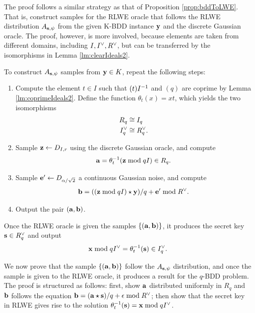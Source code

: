 \documentclass[../main.tex]{subfiles}
\begin{document}
The proof follows a similar strategy as that of Proposition \ref{prop:bddToLWE}. That is, construct samples for the RLWE oracle that follows the RLWE distribution $A_{\mathbf{s},\psi}$ from the given K-BDD instance $\mathbf{y}$ and the discrete Gaussian oracle. The proof, however, is more involved, because elements are taken from different domains, including $I, I^{\vee}, R^{\vee}$, but can be transferred by the isomorphisms in Lemma \ref{lm:clearIdeals2}. 

To construct $A_{\mathbf{s},\psi}$ samples from $\mathbf{y} \in K$, repeat the following steps: 
\begin{enumerate}
    \item Compute the element $t \in I$ such that $(t)I^{-1}$ and $(q)$ are coprime by Lemma \ref{lm:coprimeIdeals2}. Define the function $\theta_t(x) = xt$, which yields the two isomorphisms 
    \begin{align*}
        R_q & \cong I_q \\ 
        I^{\vee}_q &\cong R^{\vee}_q.
    \end{align*}
    
    \item Sample $\mathbf{z} \leftarrow D_{I, r}$ using the discrete Gaussian oracle, and compute 
    \begin{align*}
        \mathbf{a} =\theta^{-1}_t(\mathbf{z} \bmod qI) \in R_q.
    \end{align*}
    
    \item Sample $\mathbf{e}' \leftarrow D_{\alpha/\sqrt{2}}$ a continuous Gaussian noise, and compute 
    \begin{align*}
        \mathbf{b} = ((\mathbf{z} \bmod qI) \star \mathbf{y})/q + \mathbf{e}' \bmod R^{\vee}.
    \end{align*}
    
    \item Output the pair $(\mathbf{a},\mathbf{b})$.
    
\end{enumerate}
Once the RLWE oracle is given the samples $\{(\mathbf{a},\mathbf{b})\}$, it produces the secret key $\mathbf{s} \in R^{\vee}_q$ and output 
\begin{align*}
    \mathbf{x} \bmod qI^{\vee} = \theta^{-1}_t(\mathbf{s}) \in I^{\vee}_q.
\end{align*}

We now prove that the sample $\{(\mathbf{a},\mathbf{b})\}$ follow the $A_{\mathbf{s},\psi}$ distribution,
and once the sample is given to the RLWE oracle, it produces a result for the $q$-BDD problem. The proof is structured as follows: first, show $\mathbf{a}$ distributed uniformly in $R_q$ and $\mathbf{b}$ follows the equation $\mathbf{b}=(\mathbf{a} \star \mathbf{s})/q + \mathbf{\epsilon} \bmod R^{\vee}$; then show that the secret key in RLWE gives rise to the solution $\theta^{-1}_t(\mathbf{s}) = \mathbf{x} \bmod qI^{\vee}$.  
\end{document}
